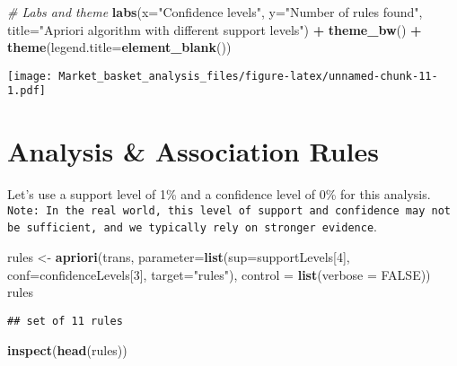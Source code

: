 \documentclass[
]{article}
\newenvironment{Shaded}{\begin{snugshade}}{\end{snugshade}}
\newcommand{\AttributeTok}[1]{\textcolor[rgb]{0.13,0.29,0.53}{#1}}
\newcommand{\CommentTok}[1]{\textcolor[rgb]{0.56,0.35,0.01}{\textit{#1}}}
\newcommand{\ConstantTok}[1]{\textcolor[rgb]{0.56,0.35,0.01}{#1}}
\newcommand{\DecValTok}[1]{\textcolor[rgb]{0.00,0.00,0.81}{#1}}
\newcommand{\FunctionTok}[1]{\textcolor[rgb]{0.13,0.29,0.53}{\textbf{#1}}}
\newcommand{\NormalTok}[1]{#1}
\newcommand{\OtherTok}[1]{\textcolor[rgb]{0.56,0.35,0.01}{#1}}
\newcommand{\SpecialCharTok}[1]{\textcolor[rgb]{0.81,0.36,0.00}{\textbf{#1}}}
\newcommand{\StringTok}[1]{\textcolor[rgb]{0.31,0.60,0.02}{#1}}
\begin{document}
\begin{Shaded}
\begin{Highlighting}[]
  \CommentTok{\# Labs and theme}
  \FunctionTok{labs}\NormalTok{(}\AttributeTok{x=}\StringTok{"Confidence levels"}\NormalTok{, }\AttributeTok{y=}\StringTok{"Number of rules found"}\NormalTok{, }
       \AttributeTok{title=}\StringTok{"Apriori algorithm with different support levels"}\NormalTok{) }\SpecialCharTok{+}
  \FunctionTok{theme\_bw}\NormalTok{() }\SpecialCharTok{+}
  \FunctionTok{theme}\NormalTok{(}\AttributeTok{legend.title=}\FunctionTok{element\_blank}\NormalTok{())}
\end{Highlighting}
\end{Shaded}

\texttt{[image: Market\_basket\_analysis\_files/figure-latex/unnamed-chunk-11-1.pdf]}

\section{\texorpdfstring{\textbf{Analysis \& Association
Rules}}{Analysis \& Association Rules}}\label{analysis-association-rules}

Let's use a support level of 1\% and a confidence level of 0\% for this
analysis.
\texttt{Note:\ In\ the\ real\ world,\ this\ level\ of\ support\ and\ confidence\ may\ not\ be\ sufficient,\ and\ we\ typically\ rely\ on\ stronger\ evidence}.

\begin{Shaded}
\begin{Highlighting}[]
\NormalTok{rules }\OtherTok{\textless{}{-}} \FunctionTok{apriori}\NormalTok{(trans, }\AttributeTok{parameter=}\FunctionTok{list}\NormalTok{(}\AttributeTok{sup=}\NormalTok{supportLevels[}\DecValTok{4}\NormalTok{], }
                                                   \AttributeTok{conf=}\NormalTok{confidenceLevels[}\DecValTok{3}\NormalTok{], }\AttributeTok{target=}\StringTok{"rules"}\NormalTok{), }
                                \AttributeTok{control =} \FunctionTok{list}\NormalTok{(}\AttributeTok{verbose =} \ConstantTok{FALSE}\NormalTok{))}
\NormalTok{rules}
\end{Highlighting}
\end{Shaded}

\begin{verbatim}
## set of 11 rules
\end{verbatim}

\begin{Shaded}
\begin{Highlighting}[]
\FunctionTok{inspect}\NormalTok{(}\FunctionTok{head}\NormalTok{(rules))}
\end{Highlighting}
\end{Shaded}
\end{document}
